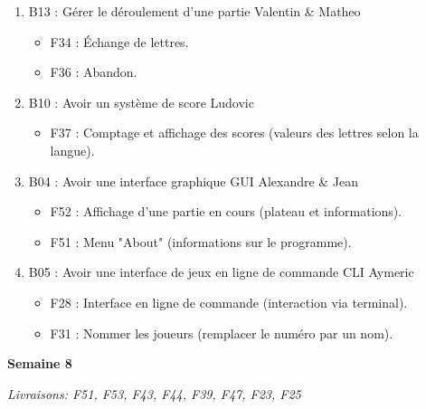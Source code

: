 \documentclass[a4paper,12pt]{article}
\begin{document}
\begin{enumerate}
\item B13 : Gérer le déroulement d’une partie\newline
Valentin \& Matheo
  \begin{itemize}
    \item F34 : Échange de lettres.
    \item F36 : Abandon.
  \end{itemize}
\item B10 : Avoir un système de score\newline
Ludovic
  \begin{itemize}
    \item F37 : Comptage et affichage des scores (valeurs des lettres selon la langue).
  \end{itemize}
\item B04 : Avoir une interface graphique GUI\newline
Alexandre \& Jean
  \begin{itemize}
    \item F52 : Affichage d’une partie en cours (plateau et informations).
    \item F51 : Menu "About" (informations sur le programme).
  \end{itemize}
\item B05 : Avoir une interface de jeux en ligne de commande CLI\newline
Aymeric
  \begin{itemize}
    \item F28 : Interface en ligne de commande (interaction via terminal).
    \item F31 : Nommer les joueurs (remplacer le numéro par un nom).\newline
  \end{itemize}
\end{enumerate}

\textbf{\large{Semaine 8}}

\textit{Livraisons: F51, F53, F43, F44, F39, F47, F23, F25}
\end{document}
